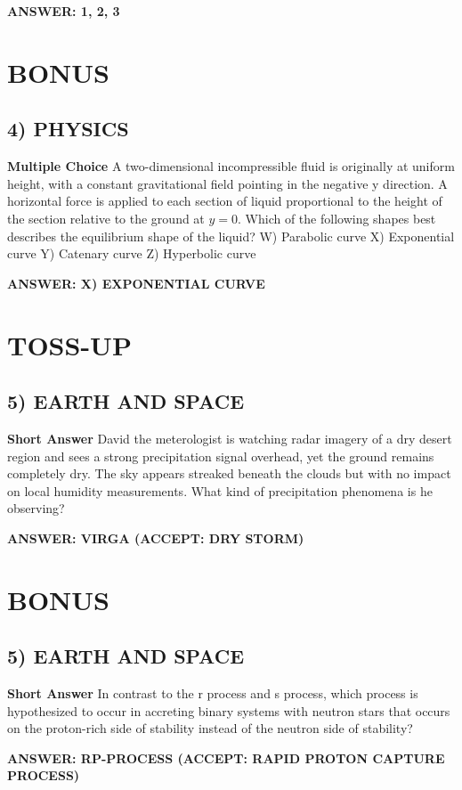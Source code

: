 \documentclass{article}
\begin{document}
\textbf{ANSWER: 1, 2, 3}

\section*{BONUS}
\subsection*{4) PHYSICS}
\textbf{Multiple Choice} A two-dimensional incompressible fluid is originally at uniform height, with a constant gravitational field pointing in the negative y direction.
A horizontal force is applied to each section of liquid proportional to the height of the section relative to the ground at $y=0$. Which of the following shapes best describes the equilibrium shape of the liquid?
W) Parabolic curve
X) Exponential curve
Y) Catenary curve
Z) Hyperbolic curve

\textbf{ANSWER: X) EXPONENTIAL CURVE}

\section*{TOSS-UP}
\subsection*{5) EARTH AND SPACE}
\textbf{Short Answer} David the meterologist is watching radar imagery of a dry desert region and sees a strong precipitation signal overhead, yet the ground remains completely dry.
The sky appears streaked beneath the clouds but with no impact on local humidity measurements.
What kind of precipitation phenomena is he observing?

\textbf{ANSWER: VIRGA (ACCEPT: DRY STORM)}

\section*{BONUS}
\subsection*{5) EARTH AND SPACE}
\textbf{Short Answer} In contrast to the r process and s process, which process is hypothesized to occur in accreting binary systems with neutron stars that occurs on the proton-rich side of stability instead of the neutron side of stability?

\textbf{ANSWER: RP-PROCESS (ACCEPT: RAPID PROTON CAPTURE PROCESS)}
\end{document}
